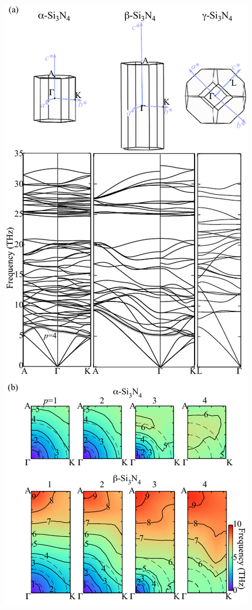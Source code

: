 \documentclass[twocolumn,amsmath,amssymb,a4paper,prb,superscriptaddress,floatfix]{revtex4-1}
\begin{document}
\begin{figure}[H]
         \begin{center}
                   \includegraphics[width=0.90\linewidth]{Fig4_ver5_338_resize2_woDOS_color_simplified_no_symm.pdf}

\end{center}
\end{figure}
\end{document}
